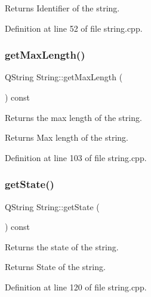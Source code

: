 \begin{DoxyReturn}{Returns}
Identifier of the string. 
\end{DoxyReturn}


Definition at line 52 of file string.\+cpp.

\mbox{\label{classString_af95fe7d7e2a8b604d7af3b7f0476ec0e}} 
\subsubsection{\texorpdfstring{get\+Max\+Length()}{getMaxLength()}}
{\footnotesize\ttfamily Q\+String String\+::get\+Max\+Length (\begin{DoxyParamCaption}{ }\end{DoxyParamCaption}) const}



Returns the max length of the string. 

\begin{DoxyReturn}{Returns}
Max length of the string. 
\end{DoxyReturn}


Definition at line 103 of file string.\+cpp.

\mbox{\label{classString_ae5ee38919f5a360e0283baedb11c48e0}} 
\subsubsection{\texorpdfstring{get\+State()}{getState()}}
{\footnotesize\ttfamily Q\+String String\+::get\+State (\begin{DoxyParamCaption}{ }\end{DoxyParamCaption}) const}



Returns the state of the string. 

\begin{DoxyReturn}{Returns}
State of the string. 
\end{DoxyReturn}


Definition at line 120 of file string.\+cpp.

\mbox{\label{classString_a926f7c30cfca26009604d0c765950c4b}} 
